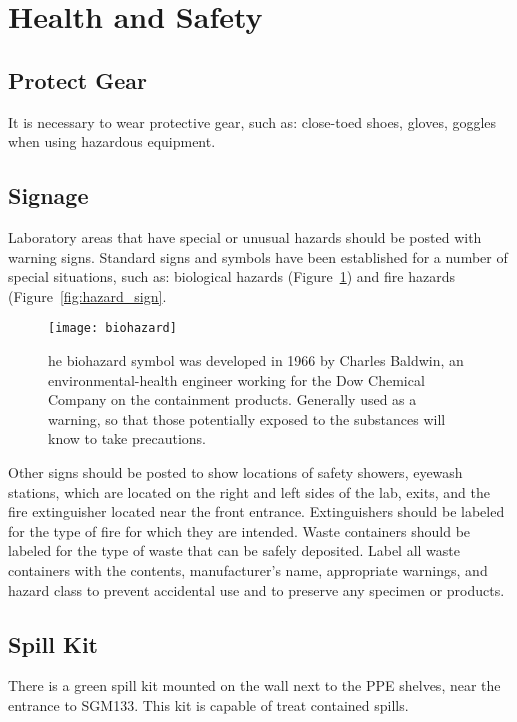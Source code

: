 \documentclass[12pt]{../SOP4_alpha}\usepackage[]{graphicx}\usepackage[]{color}
\begin{document}
\section{Health and Safety}

\subsection{Protect Gear}

\NP It is necessary to wear protective gear, such as: close-toed shoes, gloves, goggles when using hazardous equipment.

\subsection{Signage}

\NP Laboratory areas that have special or unusual hazards should be posted with warning signs. Standard signs and symbols have been established for a number of special situations, such as: biological hazards (Figure~\ref{fig:biohzard}) and fire hazards (Figure~\ref{fig:hazard_sign}.


\begin{figure}
  \centering
  \texttt{[image: biohazard]}
  \caption{he biohazard symbol was developed in 1966 by Charles Baldwin, an environmental-health engineer working for the Dow Chemical Company on the containment products. Generally used as a warning, so that those potentially exposed to the substances will know to take precautions.}
  \label{fig:biohzard}
\end{figure}
\NP Other signs should be posted to show locations of safety showers, eyewash stations, which are located on the right and left sides of the lab, exits, and the fire extinguisher located near the front entrance. Extinguishers should be labeled for the type of fire for which they are intended. Waste containers should be labeled for the type of waste that can be safely deposited. Label all waste containers with the contents, manufacturer's name, appropriate warnings, and hazard class to prevent accidental use and to preserve any specimen or products. 

\subsection{Spill Kit} 

\NP There is a green spill kit mounted on the wall next to the PPE shelves, near the entrance to SGM133. This kit is capable of treat contained spills.
\end{document}
